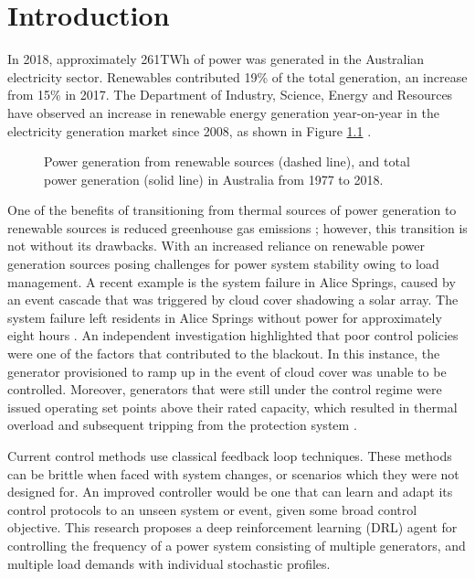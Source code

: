 \chapter{Introduction}
In 2018, approximately 261$\si{\tera\watt\hour}$ of power was generated in the Australian electricity sector. Renewables contributed 19\% of the total generation, an increase from 15\% in 2017. The Department of Industry, Science, Energy and Resources have observed an increase in renewable energy generation year-on-year in the electricity generation market since 2008, as shown in Figure \ref{fig:101_renewable_energy} \cite{Diser2020}.\\

\begin{figure}[ht]
	\centering
	
	\caption[Renewable power generation versus total power generation 1977 to 2018]{Power generation from renewable sources (dashed line), and total power generation (solid line) in Australia from 1977 to 2018.}
	\label{fig:101_renewable_energy}
\end{figure}

One of the benefits of transitioning from thermal sources of power generation to renewable sources is reduced greenhouse gas emissions \cite{IPCC2012}; however, this transition is not without its drawbacks. With an increased reliance on renewable power generation sources posing challenges for power system stability owing to load management. A recent example is the system failure in Alice Springs, caused by an event cascade that was triggered by cloud cover shadowing a solar array. The system failure left residents in Alice Springs without power for approximately eight hours \cite{UCNT2019}. An independent investigation highlighted that poor control policies were one of the factors that contributed to the blackout. In this instance, the generator provisioned to ramp up in the event of cloud cover was unable to be controlled. Moreover, generators that were still under the control regime were issued operating set points above their rated capacity, which resulted in thermal overload and subsequent tripping from the protection system \cite{Wilkey2019}.

Current control methods use classical feedback loop techniques. These methods can be brittle when faced with system changes, or scenarios which they were not designed for. An improved controller would be one that can learn and adapt its control protocols to an unseen system or event, given some broad control objective. This research proposes a deep reinforcement learning (DRL) agent for controlling the frequency of a power system consisting of multiple generators, and multiple load demands with individual stochastic profiles.

